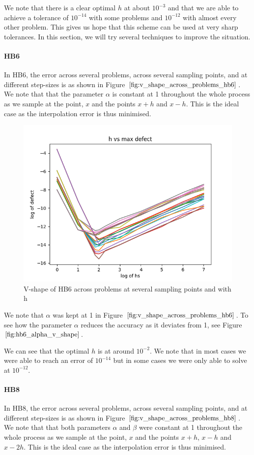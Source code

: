 We note that there is a clear optimal $h$ at about $10^{-3}$ and that we are able to achieve a tolerance of  $10^{-14}$ with some problems and $10^{-12}$ with almost every other problem. This gives us hope that this scheme can be used at very sharp tolerances. In this section, we will try several techniques to improve the situation. 


\paragraph{HB6}
In HB6, the error across several problems, across several sampling points, and at different step-sizes is as shown in Figure $\ref{fig:v_shape_across_problems_hb6}$. We note that that the parameter $\alpha$ is constant at 1 throughout the whole process as we sample at the point, $x$ and the points $x+h$ and $x-h$. This is the ideal case as the interpolation error is thus minimised.

\begin{figure}[H]
\centering
\includegraphics[width=0.7\linewidth]{./figures/v_shape_across_problems_hb6}
\caption{V-shape of HB6 across problems at several sampling points and with h}
\label{fig:v_shape_across_problems_hb6}
\end{figure}

We note that $\alpha$ was kept at 1 in Figure $\ref{fig:v_shape_across_problems_hb6}$. To see how the parameter $\alpha$ reduces the accuracy as it deviates from 1, see Figure $\ref{fig:hb6_alpha_v_shape}$.

We can see that the optimal $h$ is at around $10^{-2}$. We note that in most cases we were able to reach an error of $10^{-14}$ but in some cases we were only able to solve at $10^{-12}$. 


\paragraph{HB8}
In HB8, the error across several problems, across several sampling points, and at different step-sizes is as shown in Figure $\ref{fig:v_shape_across_problems_hb8}$. We note that that both parameters $\alpha$ and $\beta$ were constant at 1 throughout the whole process as we sample at the point, $x$ and the points $x+h$, $x-h$ and $x-2h$. This is the ideal case as the interpolation error is thus minimised. 

